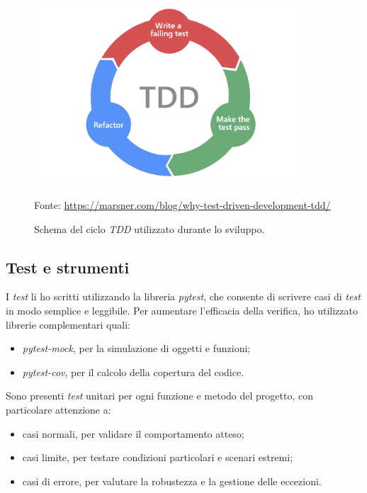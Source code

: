 \begin{figure}[H]
    \begin{center}
    \includegraphics[width=0.9\textwidth]{img/TDD.png}
    \caption{Schema del ciclo \textit{TDD} utilizzato durante lo sviluppo.}
    Fonte: \url{https://marsner.com/blog/why-test-driven-development-tdd/}
    \label{fig:tdd}
    \end{center}
\end{figure}

\subsection{Test e strumenti}
I \textit{test} li ho scritti utilizzando la libreria \textit{pytest}, che consente di scrivere casi di \textit{test} in modo semplice e leggibile. Per aumentare l'efficacia della verifica, ho utilizzato librerie complementari quali:
\begin{itemize}
    \item \textit{pytest-mock}, per la simulazione di oggetti e funzioni;
    \item \textit{pytest-cov}, per il calcolo della copertura del codice.
\end{itemize}

Sono presenti \textit{test} unitari per ogni funzione e metodo del progetto, con particolare attenzione a:
\begin{itemize}
    \item casi normali, per validare il comportamento atteso;
    \item casi limite, per testare condizioni particolari e scenari estremi;
    \item casi di errore, per valutare la robustezza e la gestione delle eccezioni.
\end{itemize}

